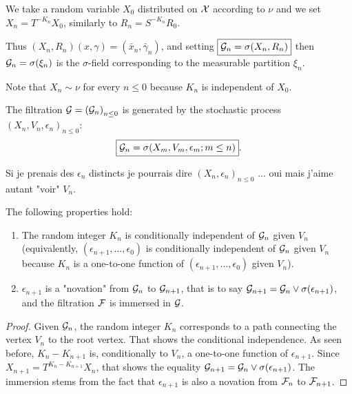 \documentclass[12pt,a4paper]{article}
\begin{document}
We take a random variable $X_0$ distributed on $\mathcal{X}$ according to $\nu$ 
and we set $\boxed{X_n = T^{-K_n} X_0}$, similarly to $R_n = S^{-K_n} R_0$. 

Thus $(X_n,R_n)(x,\gamma) = (\bar x_n, \bar\gamma_n)$, 
and setting $\boxed{\mathcal{G}_n = \sigma(X_n, R_n)}$ then 
$\mathcal{G}_n = \sigma(\xi_n)$ is the $\sigma$-field corresponding to 
the measurable partition $\xi_n$. 

Note that $X_n \sim \nu$ for every $n \leq 0$ because $K_n$ is independent of $X_0$.

The filtration $\mathcal{G}={(\mathcal{G}_n)}_{n \leq 0}$ is  generated by the stochastic process 
${(X_n, V_n, \epsilon_n)}_{n \leq 0}$:
$$
\boxed{\mathcal{G}_n = \sigma(X_m, V_m, \epsilon_m; m \leq n)}. 
$$


\begin{remark}
Si je prenais des $\epsilon_n$ distincts je pourrais dire 
${(X_n, \epsilon_n)}_{n \leq 0}$ ... oui mais j'aime autant "voir" $V_n$.
\end{remark}

\begin{lemma}\label{lemma:novation}
The following properties hold:
\begin{enumerate}
\item The random integer $K_n$ is conditionally independent of $\mathcal{G}_n$ 
given $V_n$ (equivalently, $(\epsilon_{n+1}, \ldots, \epsilon_0)$ 
is conditionally independent of $\mathcal{G}_n$ 
given $V_n$ because $K_n$ is a one-to-one function of 
$(\epsilon_{n+1}, \ldots, \epsilon_0)$ given $V_n$).

\item $\epsilon_{n+1}$ is 
a "novation" from $\mathcal{G}_n$ to $\mathcal{G}_{n+1}$, that is 
to say $\mathcal{G}_{n+1} = \mathcal{G}_n \vee \sigma(\epsilon_{n+1})$, and  
the filtration $\mathcal{F}$ is immersed in $\mathcal{G}$.
\end{enumerate}
\end{lemma}

\begin{proof}
Given $\mathcal{G}_n$, the random integer $K_n$ corresponds to a path  
connecting the vertex $V_n$ to the root vertex. 
That shows the conditional independence. 
As seen before, $K_{n}-K_{n+1}$ is, conditionally to $V_n$, 
a one-to-one function of $\epsilon_{n+1}$. Since 
$X_{n+1} = T^{K_{n}-K_{n+1}}X_n$, that shows the equality 
$\mathcal{G}_{n+1} = \mathcal{G}_n \vee \sigma(\epsilon_{n+1})$. 
The immersion stems from the fact that 
 $\epsilon_{n+1}$ is also a novation from $\mathcal{F}_n$ to $\mathcal{F}_{n+1}$.  
\end{proof}
\end{document}
